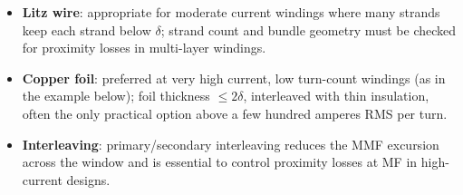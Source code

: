 \documentclass[11pt,a4paper]{article}
\begin{document}
\begin{itemize}
    \item \textbf{Litz wire}: appropriate for moderate current windings where many
    strands keep each strand below $\delta$; strand count and bundle geometry must
    be checked for proximity losses in multi-layer windings.
    \item \textbf{Copper foil}: preferred at very high current, low turn-count
    windings (as in the example below); foil thickness $\le 2\delta$, interleaved
    with thin insulation, often the only practical option above a few hundred
    amperes RMS per turn.
    \item \textbf{Interleaving}: primary/secondary interleaving reduces the MMF
    excursion across the window and is essential to control proximity losses at
    MF in high-current designs.
\end{itemize}
\end{document}
